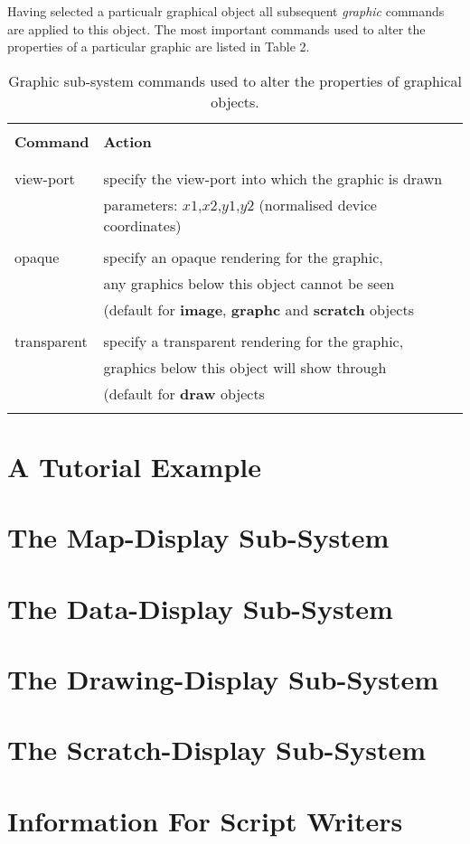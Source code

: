 Having selected a particualr graphical object all subsequent {\em graphic}
commands are applied to this object.  The most important commands used
to alter the properties of a particular graphic are listed in Table 2.
\begin{table}
\begin{tabular}{|l||l|}
\hline
& \\
{\bf Command} & {\bf Action} \\
& \\ \hline
& \\
view-port & specify the view-port into which the graphic is drawn \\
& parameters: $x1$,$x2$,$y1$,$y2$ (normalised device coordinates) \\
& \\
opaque &  specify an opaque rendering for the graphic, \\
& any graphics below this object cannot be seen \\
& (default for {\bf image}, {\bf graphc} and {\bf scratch} objects \\ 
& \\
transparent & specify a transparent rendering for the graphic, \\
& graphics below this object will show through \\
& (default for {\bf draw} objects \\
& \\ \hline
\end{tabular}
\caption{Graphic sub-system commands used to alter the properties of
graphical objects.}
\end{table}

\section{A Tutorial Example}

\section{The Map-Display Sub-System}
\section{The Data-Display Sub-System}
\section{The Drawing-Display Sub-System}
\section{The Scratch-Display Sub-System}
\section{Information For Script Writers}









